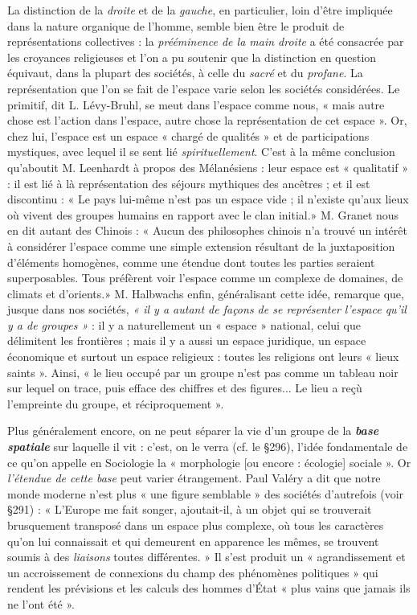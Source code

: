 \vspace{0.24cm}
{\footnotesize La distinction de la {\it droite} et de la {\it gauche}, en particulier,
loin d'être impliquée dans la nature organique de l’homme, semble bien être le produit
de représentations collectives : la \textsf{\textit {prééminence de la main droite}} a été consacrée
par les croyances religieuses et l’on a pu soutenir que la distinction en
question équivaut, dans la plupart des sociétés, à celle du {\it sacré} et du {\it profane}.
La représentation que l’on se fait de l’espace varie selon les sociétés considérées.
Le primitif, dit L. Lévy-Bruhl, se meut dans l’espace comme nous,
« mais autre chose est l’action dans l’espace, autre chose la représentation
de cet espace ». Or, chez lui, l'espace est un espace « chargé de qualités »
et de participations mystiques, avec lequel il se sent lié {\it spirituellement}.
C’est à la même conclusion qu’aboutit M. Leenhardt à propos des Mélanésiens :
leur espace est « qualitatif » : il est lié à là représentation des
séjours mythiques des ancêtres ; et il est discontinu : « Le pays lui-même
n'est pas un espace vide ; il n'existe qu'aux lieux où vivent des groupes
humains en rapport avec le clan initial.» M. Granet nous en dit autant des
Chinois : « Aucun des philosophes chinois n’a trouvé un intérêt à considérer
l'espace comme une simple extension résultant de la juxtaposition d’éléments
homogènes, comme une étendue dont toutes les parties seraient
superposables. Tous préfèrent voir l’espace comme un complexe de domaines,
de climats et d'orients.» M. Halbwachs enfin, généralisant cette idée,
remarque que, jusque dans nos sociétés, \textsf{\textit {« il y a autant de façons de se
représenter l’espace qu'il y a de groupes »}} : il y a naturellement un « espace »
national, celui que délimitent les frontières ; mais il y a aussi un espace
juridique, un espace économique et surtout un espace religieux : toutes
les religions ont leurs « lieux saints ». Ainsi, « le lieu occupé par un
groupe n’est pas comme un tableau noir sur lequel on trace, puis efface
des chiffres et des figures... Le lieu a reçù l'empreinte du groupe, et réciproquement ».}
\vspace{0.31cm}

Plus généralement encore, on ne peut séparer la vie d’un groupe
de la \textbf{\textit {base spatiale}} sur laquelle il vit : c’est, on le verra (cf. le \S 296),
l’idée fondamentale de ce qu’on appelle en Sociologie la « morphologie
[ou encore : écologie] sociale ». Or {\it l'étendue de cette base} peut varier
étrangement. Paul Valéry a dit que notre monde moderne n’est plus
« une figure semblable » des sociétés d’autrefois (voir \S 291) : « L’Europe
me fait songer, ajoutait-il, à un objet qui se trouverait brusquement
transposé dans un espace plus complexe, où tous les caractères
qu’on lui connaissait et qui demeurent en apparence les mêmes, se
trouvent soumis à des {\it liaisons} toutes différentes. » Il s’est produit
un « agrandissement et un accroissement de connexions du champ des
phénomènes politiques » qui rendent les prévisions et les calculs des
hommes d’État « plus vains que jamais ils ne l’ont été ».


